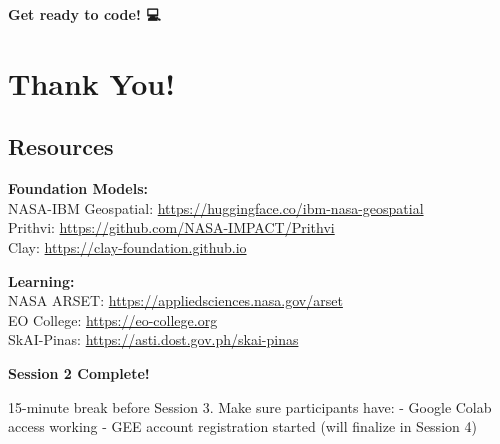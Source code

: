\documentclass[
  letterpaper,
  DIV=11,
  numbers=noendperiod]{scrartcl}
\begin{document}
\textbf{Get ready to code! 💻}

\section{Thank You!}\label{thank-you}

\subsection{Resources}\label{resources}

\textbf{Foundation Models:}\\
NASA-IBM Geospatial: \url{https://huggingface.co/ibm-nasa-geospatial}\\
Prithvi: \url{https://github.com/NASA-IMPACT/Prithvi}\\
Clay: \url{https://clay-foundation.github.io}

\textbf{Learning:}\\
NASA ARSET: \url{https://appliedsciences.nasa.gov/arset}\\
EO College: \url{https://eo-college.org}\\
SkAI-Pinas: \url{https://asti.dost.gov.ph/skai-pinas}

\textbf{Session 2 Complete!}

15-minute break before Session 3. Make sure participants have: - Google
Colab access working - GEE account registration started (will finalize
in Session 4)
\end{document}

